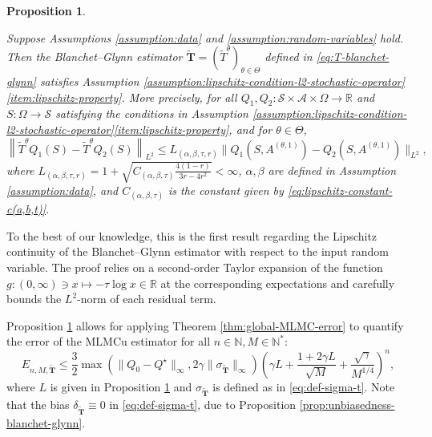 \documentclass[11pt]{article}
\numberwithin{equation}{section}
\newtheorem{proposition}[theorem]{Proposition}
\theoremstyle{definition}
\theoremstyle{remark}
\def\cS{\mathcal{S}}
\def\N{{\mathbb{N}}}
\def\R{{\mathbb R}}
\begin{document}
\begin{proposition}
    \label{proposition:contraction-prop-T-blanchet-glynn-l2}
 
     Suppose Assumptions \ref{assumption:data} and \ref{assumption:random-variables} hold.      Then the Blanchet–Glynn estimator  
    $\tilde{\mathbf{T}} =(\tilde{T}^{\theta})_{\theta\in \Theta}  $ 
defined in \eqref{eq:T-blanchet-glynn} satisfies Assumption \ref{assumption:lipschitz-condition-l2-stochastic-operator}\ref{item:lipschitz-property}. 
More precisely, 
for all $Q_1,Q_2: \mathcal S \times \mathcal A \times \Omega \rightarrow \R$
and $S:\Omega\to \cS$
satisfying the conditions in  Assumption \ref{assumption:lipschitz-condition-l2-stochastic-operator}\ref{item:lipschitz-property}, and for   $\theta \in \Theta$,
    \begin{equation}
        \label{eq:contraction-prop-T-blanchet-glynn-l2}
        \left\|\tilde{T}^\theta Q_1(S) - \tilde{T}^\theta Q_2(S) \right\|_{L^2} \leq L_{(\alpha, \beta, \tau, r)} \|Q_1(S,A^{(\theta, 1)}) - Q_2(S,A^{(\theta, 1)})\|_{L^2},
    \end{equation}
    where
    $L_{(\alpha, \beta, \tau, r)} = 1 + \sqrt{C_{ (\alpha, \beta, \tau)} \frac{4(1-r)}{3r - 4r^2}} < \infty$, 
    $\alpha,\beta$ are defined in Assumption 
      \ref{assumption:data},
    and $C_{ (\alpha, \beta, \tau)}$ is the constant given by \eqref{eq:lipschitz-constant-c(a,b,t)}.
\end{proposition}


To the best of our knowledge, this is the first result regarding the Lipschitz continuity of the Blanchet–Glynn estimator
with respect to the input random variable.
The proof relies on a second-order Taylor expansion of the   function $g:  (0,\infty)\ni x \mapsto -\tau \log x \in \mathbb R$  
at the corresponding expectations and carefully bounds the
  $L^2$-norm of each residual term. 

  


Proposition 
\ref{proposition:contraction-prop-T-blanchet-glynn-l2} allows for  applying Theorem \ref{thm:global-MLMC-error} to quantify   the   error of the MLMCu estimator for all $n \in \N, M \in \N^*$:
\begin{equation}
        \label{eq:final-MLMC-error-blanchet-Glynn}
        E _{n,M,\tilde{\mathbf T}} \leq \frac{3}{2}\max\left( \| Q_0 - Q^\star\|_{\infty},  2 \gamma \| \sigma_{\tilde{\mathbf T}} \|_{\infty} \right) \left( \gamma L + \frac{1 + 2\gamma L}{\sqrt{M}} + \frac{\sqrt{{\gamma}}}{M^{1/4}} \right)^n,
    \end{equation}
 where $L $ is given in Proposition \ref{proposition:contraction-prop-T-blanchet-glynn-l2} and $\sigma_{\tilde{\mathbf T}}$ is defined as in  \eqref{eq:def-sigma-t}.
Note that the bias 
$\delta_{\tilde{\mathbf T}}\equiv 0$ in
\eqref{eq:def-sigma-t}, due to  
 Proposition \ref{prop:unbiasedness-blanchet-glynn}.
\end{document}
